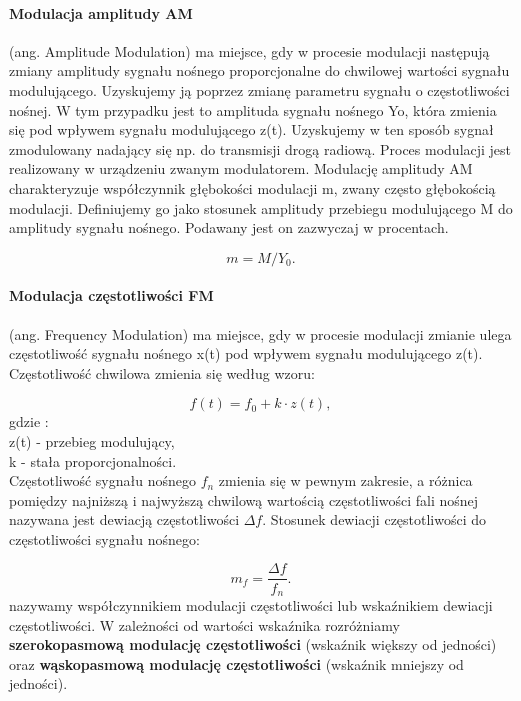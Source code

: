 \documentclass[a4paper,twoside]{report}
\begin{document}
\paragraph{Modulacja amplitudy AM} (ang. Amplitude Modulation) ma miejsce, gdy w procesie modulacji następują zmiany amplitudy sygnału nośnego proporcjonalne do chwilowej wartości sygnału modulującego. Uzyskujemy ją poprzez zmianę parametru sygnału o częstotliwości nośnej. W tym przypadku jest to amplituda sygnału nośnego Yo, która zmienia się pod wpływem sygnału modulującego z(t). Uzyskujemy w ten sposób sygnał zmodulowany nadający się np. do transmisji drogą radiową. Proces modulacji jest realizowany w urządzeniu zwanym modulatorem. Modulację amplitudy AM charakteryzuje współczynnik głębokości modulacji m, zwany często głębokością modulacji. Definiujemy go jako stosunek amplitudy przebiegu modulującego M do amplitudy sygnału nośnego. Podawany jest on zazwyczaj w procentach. 

\begin{equation}
m=M/Y_0.
\end{equation}

\paragraph{Modulacja częstotliwości FM} (ang. Frequency Modulation) ma miejsce, gdy w procesie modulacji zmianie ulega częstotliwość sygnału nośnego x(t) pod wpływem sygnału modulującego z(t). Częstotliwość chwilowa zmienia się według wzoru:

\begin{equation}
f(t)=f_0+k\cdot z(t),
\end{equation}
gdzie : \\
z(t) - przebieg modulujący,\\
k - stała proporcjonalności.\\

Częstotliwość sygnału nośnego $f_n$ zmienia się w pewnym zakresie, a różnica pomiędzy najniższą i najwyższą chwilową wartością częstotliwości fali nośnej nazywana jest dewiacją częstotliwości $\Delta f$. Stosunek dewiacji częstotliwości do częstotliwości sygnału nośnego:

\begin{equation}
 m_f=\dfrac{\Delta f}{f_n}. 
\end{equation}
nazywamy współczynnikiem modulacji częstotliwości lub wskaźnikiem dewiacji częstotliwości. W zależności od wartości wskaźnika rozróżniamy \textbf{szerokopasmową modulację częstotliwości} (wskaźnik większy od jedności) oraz \textbf{wąskopasmową modulację częstotliwości} (wskaźnik mniejszy od jedności).
 
\end{document}
